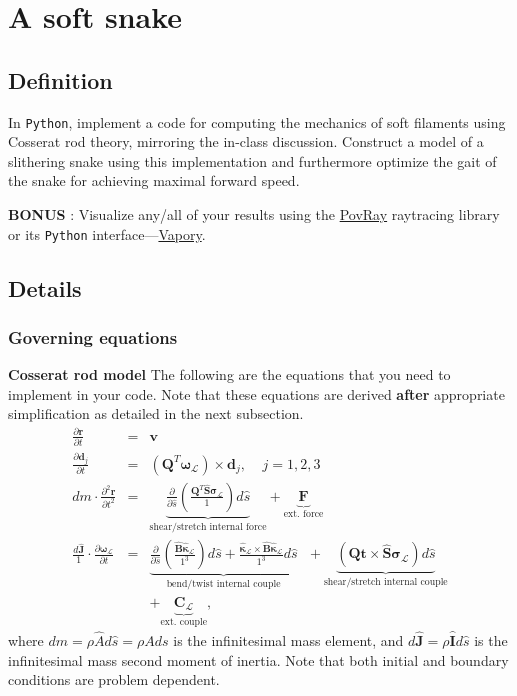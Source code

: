 \documentclass[11pt]{article}
\begin{document}
\section{A soft snake}
\label{sec:org0a0b2ff}
\subsection{Definition}
\label{sec:orgb45289e}
In \texttt{Python}, implement a code for computing the mechanics of soft filaments
using Cosserat rod theory, mirroring the in-class discussion. Construct a
model of a slithering snake using this implementation and furthermore
optimize the gait of the snake for achieving maximal forward speed.

\textbf{BONUS} : Visualize any/all of your results using the \href{http://www.povray.org/}{PovRay} raytracing
library or its \texttt{Python} interface---\href{https://github.com/Zulko/vapory}{Vapory}.
\subsection{Details}
\label{sec:org8e78a65}
\subsubsection{Governing equations}
\label{sec:orgaf82ebb}
\textbf{Cosserat rod model}
 The following are the equations that you need to implement in your code.
 Note that these equations are derived \textbf{after} appropriate simplification as
 detailed in the next subsection.
\begin{eqnarray}
\frac{\partial \mathbf{r}}{\partial t} &=& \mathbf{v}\label{eq:velfinal} \\
\frac{\partial \mathbf{d}_j}{\partial t} &=& (\mathbf{Q}^T\boldsymbol{\omega}_{\mathcal{L}}) \times \mathbf{d}_j,~~~~~j=1,2,3\label{eq:framefinal}\\
dm \cdot \frac{\partial^2 \mathbf{r}}{\partial t ^2} &=& \underbrace{\frac{\partial}{\partial \hat{s}} \left(\frac{\mathbf{Q}^T\hat{\mathbf{S}}\boldsymbol{\sigma}_{\mathcal{L}}}{1}\right)d\hat{s}}_{\text{{shear/stretch} internal force}} +\underbrace{\mathbf{F}\label{eq:linmomentfinal}}_{\text{ext. force}}\\
\frac{d\hat{\mathbf{J}}}{1} \cdot \frac{\partial \boldsymbol{\omega}_{\mathcal{L}}}{\partial t} &=& \underbrace{\frac{\partial}{\partial \hat{s}}\left(\frac{\hat{\mathbf{B}}\hat{\boldsymbol{\kappa}}_{\mathcal{L}}}{1^3}\right)d\hat{s} + \frac{\hat{\boldsymbol{\kappa}}_{\mathcal{L}}\times\hat{\mathbf{B}}\hat{\boldsymbol{\kappa}}_{\mathcal{L}}}{1^3}d\hat{s}}_{\text{{bend/twist} internal couple}}~~~+ \underbrace{\left(\mathbf{Q}\mathbf{t}\times\hat{\mathbf{S}}\boldsymbol{\sigma}_{\mathcal{L}}\right)d\hat{s}}_{\text{{shear/stretch} internal couple}}\nonumber\\
&&+ \underbrace{\mathbf{C}_{\mathcal{L}}}_{\text{ext. couple}},\label{eq:angmomentfinal}
\end{eqnarray}
where \(dm=\rho \hat{A} d\hat{s}=\rho A ds\) is the infinitesimal mass
element, and \(d\hat{\mathbf{J}}=\rho\hat{\mathbf{I}} d\hat{s}\) is the
infinitesimal mass second moment of inertia. Note that both
initial and boundary conditions are problem dependent.
\end{document}
